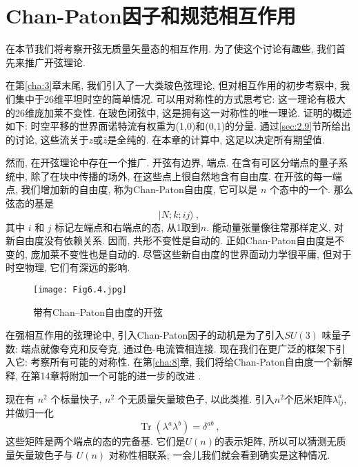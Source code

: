 \section{Chan-Paton因子和规范相互作用} \label{sec:6.5}%

在本节我们将考察开弦无质量矢量态的相互作用. 为了使这个讨论有趣些, 我们首先来推广开弦理论.

在第\ref{cha:3}章末尾, 我们引入了一大类玻色弦理论, 但对相互作用的初步考察中, 我们集中于26维平坦时空的简单情况. 
可以用对称性的方式思考它: 这一理论有极大的26维庞加莱不变性. 在玻色闭弦中, 这是拥有这一对称性的唯一理论. 
证明的概述如下: 时空平移的世界面诺特流有权重为(1,0)和(0,1)的分量.  通过\ref{sec:2.9}节所给出的讨论, 
这些流关于$z$或$\bar{z}$是全纯的. 在本章的计算中, 这足以决定所有期望值.

然而, 在开弦理论中存在一个推广. 开弦有边界, 端点. 在含有可区分端点的量子系统中, 除了在块中传播的场外, 在这些点上很自然地含有自由度. 
在开弦的每一端点, 我们增加新的自由度, 称为Chan-Paton自由度, 它可以是 $n$ 个态中的一个. 那么弦态的基是
\begin{equation}
	|N ; k ; i j\rangle \:, \label{6.5.1}
\end{equation}
其中 $i$ 和 $j$ 标记左端点和右端点的态, 从1取到$n$. 能动量张量像往常那样定义, 对新自由度没有依赖关系. 因而, 共形不变性是自动的. 
正如Chan-Paton自由度是不变的, 庞加莱不变性也是自动的. 尽管这些新自由度的世界面动力学很平庸, 但对于时空物理, 它们有深远的影响. 

\begin{figure}[h]
	\begin{center}
		\texttt{[image: Fig6.4.jpg]}\\
		\caption{带有Chan--Paton自由度的开弦}\label{fig:6.4}
	\end{center}
\end{figure}

在强相互作用的弦理论中, 引入Chan-Paton因子的动机是为了引入$S U(3)$ 味量子数: 端点就像夸克和反夸克, 通过色-电流管相连接. 现在我们在更广泛的框架下引入它: 考察所有可能的对称性. 在第\ref{cha:8}章, 我们将给Chan-Paton自由度一个新解释, 在第14章将附加一个可能的进一步的改进 .

现在有 $n^{2}$ 个标量快子, $n^{2}$ 个无质量矢量玻色子, 以此类推. 引入$n^{2}$个厄米矩阵$\lambda_{i j}^{a}$, 并做归一化
\begin{equation}
	\operatorname{Tr}(\lambda^{a} \lambda^{b})=\delta^{a b} \:, \label{6.5.2}
\end{equation}
这些矩阵是两个端点的态的完备基. 它们是$U(n)$的表示矩阵, 所以可以猜测无质量矢量玻色子与 $U(n)$ 对称性相联系; 一会儿我们就会看到确实是这种情况.

